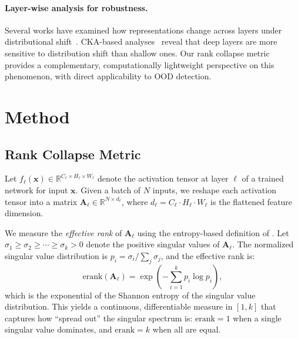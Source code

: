 \documentclass{article}
\begin{document}
\paragraph{Layer-wise analysis for robustness.}
Several works have examined how representations change across layers under distributional shift~\citep{raghu2017svcca,kornblith2019similarity}. CKA-based analyses~\citep{nguyen2021wide} reveal that deep layers are more sensitive to distribution shift than shallow ones. Our rank collapse metric provides a complementary, computationally lightweight perspective on this phenomenon, with direct applicability to OOD detection.

\section{Method}
\label{sec:method}

\subsection{Rank Collapse Metric}
\label{sec:metric}

Let $f_\ell(\mathbf{x}) \in \mathbb{R}^{C_\ell \times H_\ell \times W_\ell}$ denote the activation tensor at layer $\ell$ of a trained network for input $\mathbf{x}$. Given a batch of $N$ inputs, we reshape each activation tensor into a matrix $\mathbf{A}_\ell \in \mathbb{R}^{N \times d_\ell}$, where $d_\ell = C_\ell \cdot H_\ell \cdot W_\ell$ is the flattened feature dimension.

We measure the \emph{effective rank} of $\mathbf{A}_\ell$ using the entropy-based definition of \citet{roy2007effective}. Let $\sigma_1 \geq \sigma_2 \geq \cdots \geq \sigma_k > 0$ denote the positive singular values of $\mathbf{A}_\ell$. The normalized singular value distribution is $p_i = \sigma_i / \sum_j \sigma_j$, and the effective rank is:
\begin{equation}
    \text{erank}(\mathbf{A}_\ell) = \exp\!\left( -\sum_{i=1}^{k} p_i \log p_i \right),
    \label{eq:erank}
\end{equation}
which is the exponential of the Shannon entropy of the singular value distribution. This yields a continuous, differentiable measure in $[1, k]$ that captures how ``spread out'' the singular spectrum is: $\text{erank} = 1$ when a single singular value dominates, and $\text{erank} = k$ when all are equal.
\end{document}
